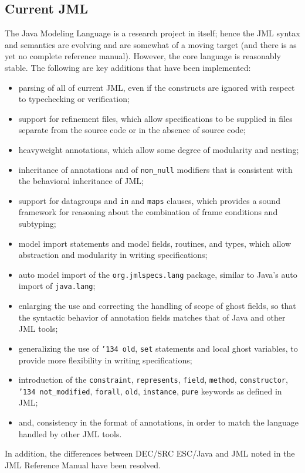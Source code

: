 \documentclass{sig-alternate}
\begin{document}
\subsection{Current JML}
The Java Modeling Language is a research project in itself; hence the
JML syntax and semantics are evolving and are somewhat of a moving
target (and there is as yet no complete reference manual).  However,
the core language is reasonably stable.  The following are key
additions that have been implemented:
\setlength{\partopsep}{0in}\setlength{\parskip}{0in}\setlength{\itemsep}{0in}\setlength{\topsep}{0in}
\begin{itemize}
\setlength{\partopsep}{0in}\setlength{\parskip}{0in}\setlength{\itemsep}{0in}\setlength{\topsep}{0in}
\item parsing of all of current JML, even if the constructs are
  ignored with respect to typechecking or verification;
\item support for refinement files, which allow specifications to be supplied in files separate from the source code or in the absence of source code;
\item heavyweight annotations, which allow some degree of modularity and nesting;
\item inheritance of annotations and of \texttt{non\_null}
  modifiers that is consistent with the behavioral inheritance of JML;
\item support for datagroups and \texttt{in} and \texttt{maps} clauses, which provides a sound framework for reasoning about the combination of frame conditions and subtyping;
\item model import statements and model fields, routines, and types, which allow abstraction 
and modularity in writing specifications;
\item auto model import of the \texttt{org.jmlspecs.lang} package, similar to Java's auto import of \texttt{java.lang};
\item enlarging the use and correcting the handling of scope of ghost fields, so that the syntactic behavior 
of annotation fields matches that of Java and other JML tools;
\item generalizing the use of \texttt{\char'134 old}, \texttt{set} statements and local ghost variables, to provide more flexibility in writing specifications;
\item introduction of the \texttt{constraint}, \texttt{represents}, \texttt{field}, \texttt{method},
\texttt{constructor}, 
\texttt{\char'134 not\_modified}, \texttt{forall}, \texttt{old}, \texttt{instance}, \texttt{pure} keywords as defined in JML;
\item and, consistency in the format of annotations, in order to match the language handled by other JML tools.
\end{itemize}
In addition, the differences between DEC/SRC ESC/Java and JML noted in the JML
Reference Manual have been resolved.
\end{document}
